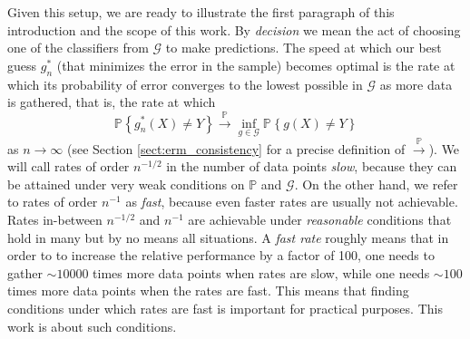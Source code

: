 \documentclass{uvamath}
\newcommand*{\calG}{\mathcal{G}}
\newcommand*{\bbP}{\mathbb{P}}
\newcommand*{\prob}[2][]{\mathbb{P}_{#1}\left\{#2\right\}}
\newcommand*{\toinP}{\overset{\bbP}{\longrightarrow}}
\theoremstyle{remark}
\theoremstyle{definition}
\theoremstyle{definition}
\theoremstyle{definition}
\theoremstyle{definition}
\theoremstyle{definition}
\begin{document}
Given this setup, we are ready to illustrate the first paragraph of
this introduction and the scope of this work. By \textit{decision} we
mean the act of choosing one of the classifiers from $\calG$ to make
predictions. The speed at which our best guess $g_n^*$ (that minimizes
the error in the sample) becomes optimal is the rate at which its
probability of error converges to the lowest possible in $\calG$ as
more data is gathered, that is, the rate at which
\begin{equation*}
  \prob{g^*_n(X)\neq Y} \toinP \inf_{g\in\calG}\prob{g(X)\neq Y}
\end{equation*}
as $n\to\infty$ (see Section \ref{sect:erm_consistency} for a precise
definition of $\toinP$). We will call rates of order $n^{-1/2}$ in the
number of data points \textit{slow}, because they can be attained
under very weak conditions on $\bbP$ and $\calG$. On the other hand,
we refer to rates of order $n^{-1}$ as \textit{fast}, because even
faster rates are usually not achievable. Rates in-between $n^{-1/2}$
and $n^{-1}$ are achievable under \textit{reasonable} conditions that
hold in many but by no means all situations. A \textit{fast rate}
roughly means that in order to to increase the relative performance by
a factor of 100, one needs to gather $\sim 10000$ times more data
points when rates are slow, while one needs $\sim 100$ times more data
points when the rates are fast. This means that finding conditions
under which rates are fast is important for practical purposes. This
work is about such conditions.
\end{document}
